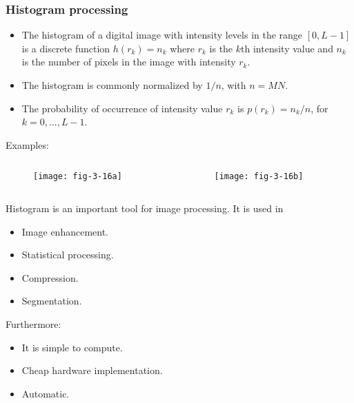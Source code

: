
\begin{frame}
\frametitle{Histogram processing}
\begin{itemize}
\item The histogram of a digital image with intensity levels in the range $[0,L-1]$ is a discrete function $h(r_{k}) = n_{k}$ where $r_{k}$ is the $k$th intensity value and $n_{k}$ is the number of pixels in the image with intensity $r_{k}$.
\item The histogram is commonly normalized by $1/n$, with $n=MN$.
\item The probability of occurrence of intensity value $r_{k}$ is $p(r_{k}) = n_{k}/n$, for $k = 0,\ldots,L-1$.
\end{itemize}
\end{frame}


\begin{frame}
Examples:
\begin{columns}
\begin{column}{.5\textwidth}
\begin{figure}
\centering
\texttt{[image: fig-3-16a]}
\end{figure}
\end{column}
\begin{column}{.5\textwidth}
\begin{figure}
\centering
\texttt{[image: fig-3-16b]}
\end{figure}
\end{column}
\end{columns}
\end{frame}


\begin{frame}
Histogram is an important tool for image processing. It is used in
\begin{itemize}
\item Image enhancement.
\item Statistical processing.
\item Compression.
\item Segmentation.
\end{itemize}
Furthermore:
\begin{itemize}
\item It is simple to compute.
\item Cheap hardware implementation.
\item Automatic.
\end{itemize}
\end{frame}

